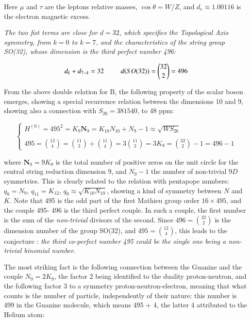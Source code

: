 \documentclass[a4paper,9pt]{article}
\begin{document}
Here $\mu$ and $\tau$ are the leptons relative masses, $\cos \theta = W/Z$, and $d_e \approx 1.00116$ is the electron magnetic excess. 

 \textit{The two fist terms are close for $d = 32$, which specifies the Topological Axis symmetry, from $k = 0$ to $k = 7$, and the characteristics of the string group SO(32), whose dimension is the third perfect number 496:}
 
 
 \begin{equation}
 d_k + d_{7-k} = 32 ~~~~~~~~~~ d(SO(32)) =  \binom{32}{2} = 496 \\ 
 \end{equation}

From the above double relation for B, the following property of the scalar boson emerges, showing a special recurrence relation between the dimensions 10 and 9, showing also a connection with $S_{26} = 381540$, to 48 ppm:

\begin{equation}
 \left\{
    \begin{array}{ll} 
            H^{(0)} = 495^2 = K_{9}\textbf{N}_9 = K_{10} N_{10} + N_{9} - 1 \approx \sqrt{WS_{26}} \\ 
            \\
       495 = \binom{12}{4} = \binom{11}{3} + \binom{11}{4} = 3\binom{11}{3} = 3K_9 = \binom{32}{2} - 1 = 496 -1
    \end{array}
\right.
\end{equation}

where  $\textbf{N}_9 = 9K_9$ is the total number of positive zeros on the unit circle for the central string reduction dimension 9, and $N_{9}-1$ the number of non-trivial $9D$ symmetries. This is clearly related to the relation with pentapope numbers: $ q_8 = N_9$, $q_{11} = K_{12}$, $q_9\approx \sqrt{K_{10} N_{10}}$, showing a kind of symmetry between $N$ and $K$. Note that 495 is the odd part of the first Mathieu group order $16\times495$, and the couple 495- 496 is the third perfect couple. In such a couple, the first number is the sum of the \textit{non-trivial} divisors of the second. Since $496 = \binom{32}{2}$ is the dimension number of the group SO(32), and $495 = \binom{12}{4}$, this leads to the conjecture : \textit{the third co-perfect number 495 could be the single one being a non-trivial binomial number}. 

The most striking fact is the following connection between the Guanine and the couple $N_9= 2K_9$, the factor 2 being identified to the duality proton-neutron, and the following factor 3 to a symmetry proton-neutron-electron, meaning that what counts is the number of particle, independently of their nature: this number is 499 in the Guanine molecule, which means 495 + 4, the latter 4 attributed to the Helium atom:
\end{document}
